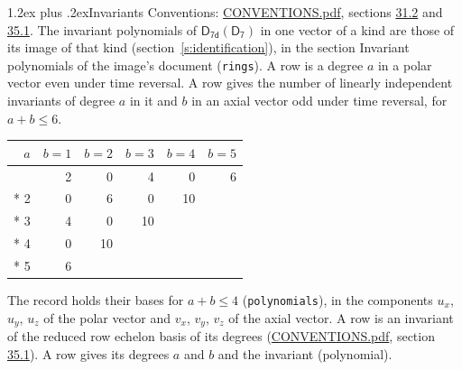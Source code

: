 \documentclass[10pt,a4paper]{article}
\makeatletter
\renewcommand\section{\@startsection{section}{1}{\z@}{-3ex plus -1ex minus -.2ex}%
  {1.2ex plus .2ex}{\normalfont\large\sffamily\bfseries\color{parttitle}}}
\numberwithin{equation}{section}
\newcommand{\grp}[1]{\mathsf{#1}}
\makeatother
\begin{document}
\section{Invariants}\label{s:invariants}
Conventions: \href{../../CONVENTIONS.pdf}{CONVENTIONS.pdf}, sections \href{../../CONVENTIONS.pdf\#conv.31.2}{31.2} and \href{../../CONVENTIONS.pdf\#conv.35.1}{35.1}.
The invariant polynomials of $\grp{D_{7d}}(\grp{D_{7}})$ in one vector of a kind are those of its image of that kind (section~\ref{s:identification}), in the section Invariant polynomials of the image's document (\texttt{rings}).
\leavevmode\label{n:index.degree.polar}\label{n:index.degree.axial}A row is a degree $a$ in a polar vector even under time reversal. A row gives the number of linearly independent invariants of degree $a$ in it and $b$ in an axial vector odd under time reversal, for $a + b \le 6$.
{\small\begin{longtable}{@{}rrrrrr@{}}\toprule
$a$ & $b = 1$ & $b = 2$ & $b = 3$ & $b = 4$ & $b = 5$\\\midrule\endhead
\bottomrule\endfoot\endlastfoot
1 & 2 & 0 & 4 & 0 & 6\\*
2 & 0 & 6 & 0 & 10 & \\*
3 & 4 & 0 & 10 &  & \\*
4 & 0 & 10 &  &  & \\*
5 & 6 &  &  &  & \\
\bottomrule\end{longtable}}
\leavevmode\label{n:local.component.polar}\label{n:local.component.axial}The record holds their bases for $a + b \le 4$ (\texttt{polynomials}), in the components $u_{x}$, $u_{y}$, $u_{z}$ of the polar vector and $v_{x}$, $v_{y}$, $v_{z}$ of the axial vector. \label{n:head.polynomial}A row is an invariant of the reduced row echelon basis of its degrees (\href{../../CONVENTIONS.pdf}{CONVENTIONS.pdf}, section \href{../../CONVENTIONS.pdf\#conv.35.1}{35.1}). A row gives its degrees $a$ and $b$ and the invariant (polynomial).
\end{document}
